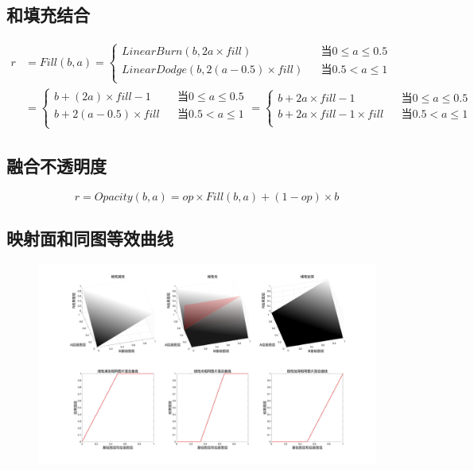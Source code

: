 \subsection{ 和填充结合}

\begin{equation}
	\begin{aligned}r&= Fill(b,a)=\left\{\begin{aligned}LinearBurn(b,2a\times fill)&&当 0\leq a \leq 0.5\\LinearDodge(b,2(a-0.5)\times fill)&&当 0.5< a \leq 1\\\end{aligned}\right.\\&=\left\{\begin{aligned}b+(2a)\times fill-1&&当 0\leq a \leq 0.5\\b+2(a-0.5)\times fill&&当 0.5< a \leq 1\\\end{aligned}\right.=\left\{\begin{aligned}b+2a\times fill-1&&当 0\leq a \leq 0.5\\b+2a\times fill-1\times fill&&当 0.5< a \leq 1\\\end{aligned}\right.\end{aligned}
	\end{equation}

\subsection{ 融合不透明度}
\begin{equation}
	r=Opacity(b,a)=op\times Fill(b,a)+(1-op)\times b
\end{equation}
\newpage
\subsection{ 映射面和同图等效曲线}
\begin{figure}[h!]
	\centering
	\includegraphics[width=\linewidth]{figure/线性光}
	\caption{}
	\label{fig:}
\end{figure}

